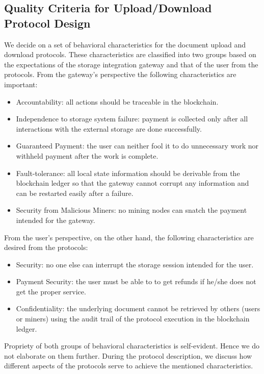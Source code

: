\documentclass[conference]{IEEEtran}
\begin{document}
\subsection{Quality Criteria for Upload/Download Protocol Design}
We decide on a set of behavioral characteristics for the document upload and download protocols. These characteristics are classified into two groups based on the expectations of the storage integration gateway and that of the user from the protocols. 
From the gateway's perspective the following characteristics are important:
\begin{itemize}
\item Accountability: all actions should be traceable in the blockchain.
\item Independence to storage system failure: payment is collected only after all interactions with the external storage are done successfully.
\item Guaranteed Payment: the user can neither fool it to do unnecessary work nor withheld payment after the work is complete.
\item Fault-tolerance: all local state information should be derivable from the blockchain ledger so that the gateway cannot corrupt any information and can be restarted easily after a failure.  
\item Security from Malicious Miners: no mining nodes can snatch the payment intended for the gateway. 
\end{itemize}   
From the user's perspective, on the other hand, the following characteristics are desired from the protocols:
\begin{itemize}
\item Security: no one else can interrupt the storage session intended for the user. 
\item Payment Security: the user must be able to to get refunds if he/she does not get the proper service. 
\item Confidentiality: the underlying document cannot be retrieved by others (users or miners) using the audit trail of the protocol execution in the blockchain ledger.
\end{itemize} 
Propriety of both groups of behavioral characteristics is self-evident. Hence we do not elaborate on them further. During the protocol description, we discuss how different aspects of the protocols serve to achieve the mentioned characteristics. 
\end{document}
